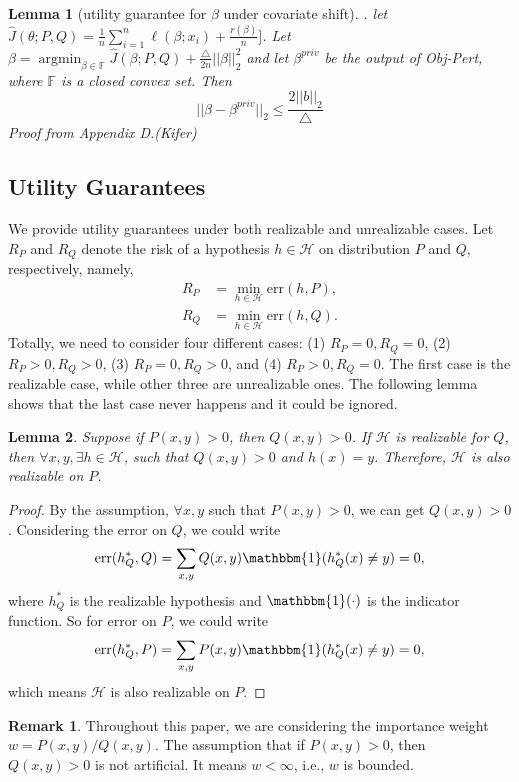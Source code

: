 \documentclass{article}
\newcommand{\argmin}{\mathop{\mathrm{argmin}}}
\def\cH{\mathcal{H}}
\newtheorem{lemma}{Lemma}
\theoremstyle{definition}
\newtheorem*{remark}{Remark}
\begin{document}
\begin{lemma}[utility guarantee for $\beta$ under covariate shift]. let $\hat J(\theta; P,Q) = \frac{1}{n}\sum_{i=1}^n \ell(\beta ; x_i) + \frac{r(\beta)}{n}]$. Let $\beta = \argmin_{\beta \in \mathbb{F}} \hat J(\beta;P,Q) + \frac{\triangle}{2n}||\beta||_2^2$ and let $\beta^{priv}$ be the output of Obj-Pert, where $\mathbb{F}$ is a closed convex set. Then
	$$
	||\beta - \beta^{priv}||_2 \leq \frac{2||b||_2}{\triangle}
	$$
	Proof from Appendix D.(Kifer)
\end{lemma}

\subsection{Utility Guarantees}
We provide utility guarantees under both realizable and unrealizable cases. Let $R_P$ and $R_Q$ denote the risk of a hypothesis $h\in \cH$ on distribution $P$ and $Q$, respectively, namely,
\begin{align*}
R_P &= \min_{h\in \cH} \text{err}(h,P),\\
R_Q &= \min_{h\in \cH} \text{err}(h,Q).
\end{align*}
Totally, we need to consider four different cases: (1) $R_P=0, R_Q=0$, (2) $R_P>0, R_Q>0$, (3) $R_P=0, R_Q>0$, and (4) $R_P>0, R_Q=0$. The first case is the realizable case, while other three are unrealizable ones. The following lemma shows that the last case never happens and it could be ignored.
\begin{lemma}
	Suppose if $P(x,y) > 0$, then $Q(x,y)>0$. If $\cH$ is realizable for $Q$, then $\forall x,y, \exists h\in \cH$, such that $Q(x,y)>0$ and $h(x)=y$. Therefore, $\cH$ is also realizable on $P$.
\end{lemma}
\begin{proof}
	By the assumption, $\forall x,y$ such that $P(x,y)>0$, we can get $Q(x,y)>0$. Considering the error on $Q$, we could write
	\begin{align*}
	\text{err}(h^*_Q,Q)=\sum_{x,y} Q(x,y)\mathbbm{1}(h^*_Q(x)\neq y)=0,
	\end{align*}
	where $h^*_Q$ is the realizable hypothesis and $\mathbbm{1}(\cdot)$ is the indicator function. So for error on $P$, we could write
	\begin{align*}
	\text{err}(h^*_Q,P)=\sum_{x,y} P(x,y)\mathbbm{1}(h^*_Q(x)\neq y)=0,
	\end{align*}
	which means $\cH$ is also realizable on $P$.
\end{proof}
\begin{remark}
	Throughout this paper, we are considering the importance weight $w=P(x,y)/Q(x,y)$. The assumption that if $P(x,y) > 0$, then $Q(x,y)>0$ is not artificial. It means $w<\infty$, i.e., $w$ is bounded.
\end{remark}
\end{document}
